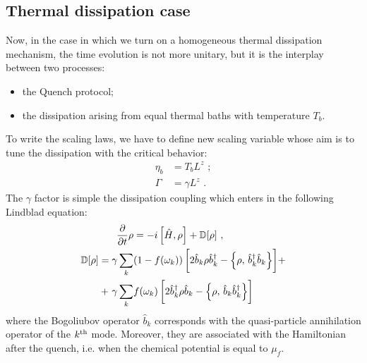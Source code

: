 \documentclass[pra,twocolumn,preprintnumbers,amsmath,amssymb,nofootinbib,floatfix,longbibliography]{revtex4}
\begin{document}
\subsection{Thermal dissipation case}

Now, in the case in which we turn on a homogeneous thermal
dissipation mechanism, the time evolution is not more
unitary, but it is the interplay between two processes:
\begin{itemize}
  \item the Quench protocol;
  \item the dissipation arising from equal thermal baths
  with temperature $T_b$.
\end{itemize}
To write the scaling laws, we have to define new scaling
variable whose aim is to tune the dissipation with the
critical behavior:
\begin{align}
	\label{TbScalvar}
	\eta_b & = T_b L^{z} \,\,;\\
	\Gamma & = \gamma L^{z} \,\,.
\end{align}
The $\gamma$ factor is simple the dissipation coupling
which enters in the following Lindblad equation:
\begin{align}
   \label{EQLindblad}
   \frac{\partial}{\partial t} \rho &= -i\,\Bigr[ \hat H,
      \rho \Bigr] + \mathbb{D}[\rho]\,\,,\\
  \mathbb{D}[\rho] = \gamma \sum_k & (1-f(\omega_k))
  \,\biggr[ 2\hat b_{k} \rho \hat b_{k}^\dagger - \Bigl\{
  \rho, \, \hat b_{k}^\dagger \hat b_{k} \Bigl\} \biggr]+
  \notag \\
  + \,\,\gamma \sum _k &
  f(\omega_k)\,\biggr[ 2\hat b_{k}^\dagger \rho \hat b_{k}-
  \Bigl\{ \rho, \, \hat b_{k} \hat b_{k}^\dagger \Bigl\}
  \biggr]
\end{align}
where the Bogoliubov operator $\hat b _k$ corresponds with
the quasi-particle annihilation operator of the
$k^{\rm th}$ mode. Moreover, they are associated with the
Hamiltonian after the quench, i.e. when the chemical
potential is equal to $\mu_f$.
\end{document}
